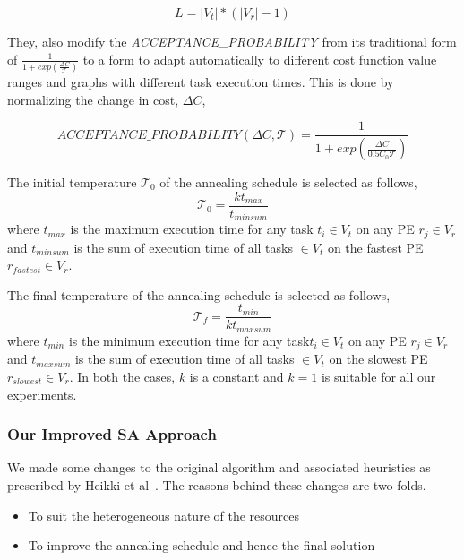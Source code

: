 \begin{equation}
L = |V_t|*(|V_r| - 1)
\end{equation}

They, also modify the \textit{ACCEPTANCE\_PROBABILITY} from its traditional form
of $\frac{1}{1+exp(\frac{\Delta C}{\mathcal{T}})}$ to a form to adapt
automatically to different cost function value ranges and graphs with different
task execution times. This is done by normalizing the change in cost, $\Delta
C$,

\begin{equation}
ACCEPTANCE\_PROBABILITY(\Delta C, \mathcal{T}) = \frac{1}{1+exp(\frac{\Delta
C}{0.5C_0\mathcal{T}})}
\end{equation}

The initial temperature $\mathcal{T}_0$ of the annealing schedule is selected as
follows,
\begin{equation}
\mathcal{T}_0 = \frac{kt_{max}}{t_{minsum}}
\end{equation}
where $t_{max}$ is the maximum execution time for any task $t_i \in V_t$ on any
PE $r_j \in V_r$ and $t_{minsum}$ is the sum of execution time of all tasks $\in
V_t$ on the fastest PE $r_{fastest} \in V_r$.

The final temperature of the annealing schedule is selected as follows,
\begin{equation}
\mathcal{T}_f = \frac{t_{min}}{kt_{maxsum}}
\end{equation}
where $t_{min}$ is the minimum execution time for any task$t_i \in V_t$ on any
PE $r_j \in V_r$ and $t_{maxsum}$ is the sum of execution time of all tasks $\in
V_t$ on the slowest PE $r_{slowest} \in V_r$. In both the cases, $k$ is a
constant and $k=1$ is suitable for all our experiments.

\subsubsection{Our Improved SA Approach}

We made some changes to the original algorithm and associated heuristics as
prescribed by Heikki et al~\cite{hors06}. The reasons behind these changes are two folds.
\begin{itemize}
\item To suit the heterogeneous nature of the resources
\item To improve the annealing schedule and hence the final solution
\end{itemize}

